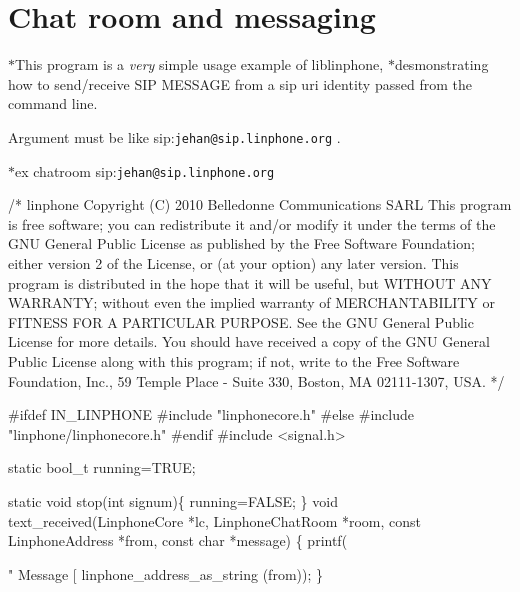 \section{Chat room and messaging}
\label{group__chatroom__tuto}
$\ast$\-This program is a {\itshape very} simple usage example of liblinphone, $\ast$desmonstrating how to send/receive S\-I\-P M\-E\-S\-S\-A\-G\-E from a sip uri identity passed from the command line. \par
Argument must be like sip\-:{\tt jehan@sip.\-linphone.\-org} . \par
 $\ast$ex chatroom sip\-:{\tt jehan@sip.\-linphone.\-org} \par
 
\begin{DoxyCodeInclude}

\textcolor{comment}{/*}
\textcolor{comment}{linphone}
\textcolor{comment}{Copyright (C) 2010  Belledonne Communications SARL }
\textcolor{comment}{}
\textcolor{comment}{This program is free software; you can redistribute it and/or}
\textcolor{comment}{modify it under the terms of the GNU General Public License}
\textcolor{comment}{as published by the Free Software Foundation; either version 2}
\textcolor{comment}{of the License, or (at your option) any later version.}
\textcolor{comment}{}
\textcolor{comment}{This program is distributed in the hope that it will be useful,}
\textcolor{comment}{but WITHOUT ANY WARRANTY; without even the implied warranty of}
\textcolor{comment}{MERCHANTABILITY or FITNESS FOR A PARTICULAR PURPOSE.  See the}
\textcolor{comment}{GNU General Public License for more details.}
\textcolor{comment}{}
\textcolor{comment}{You should have received a copy of the GNU General Public License}
\textcolor{comment}{along with this program; if not, write to the Free Software}
\textcolor{comment}{Foundation, Inc., 59 Temple Place - Suite 330, Boston, MA  02111-1307, USA.}
\textcolor{comment}{*/}

\textcolor{preprocessor}{#ifdef IN\_LINPHONE}
\textcolor{preprocessor}{}\textcolor{preprocessor}{#include "linphonecore.h"}
\textcolor{preprocessor}{#else}
\textcolor{preprocessor}{}\textcolor{preprocessor}{#include "linphone/linphonecore.h"}
\textcolor{preprocessor}{#endif}
\textcolor{preprocessor}{}
\textcolor{preprocessor}{#include <signal.h>}

\textcolor{keyword}{static} bool\_t running=TRUE;

\textcolor{keyword}{static} \textcolor{keywordtype}{void} stop(\textcolor{keywordtype}{int} signum)\{
        running=FALSE;
\}
\textcolor{keywordtype}{void} text\_received(LinphoneCore *lc, LinphoneChatRoom *room, \textcolor{keyword}{const} 
      LinphoneAddress *from, \textcolor{keyword}{const} \textcolor{keywordtype}{char} *message) \{
        printf(\textcolor{stringliteral}{" Message [%
      linphone_address_as_string (from));
\}


}
\end{DoxyCodeInclude}
